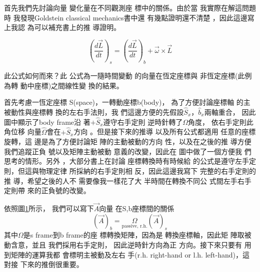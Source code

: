 \documentclass[12pt,a4paper]{article}
\begin{document}
首先我們先討論向量%
變化量在不同觀測座%
標中的關係。由於當%
我實際在解這問題時%
我發現Goldstein classical mechanics書中還%
有幾點證明還不清楚%
，因此這邊寫上我認%
為可以補充書上的推%
導證明。

\begin{equation}
\left( \frac{d\vec{L}}{dt}\right) _{s}=\left( \frac{d\vec{L}}{dt}\right)
_{b}+\vec{\omega}\times \vec{L}
\end{equation}

此公式如何而來？此%
公式為一隨時間變動%
的向量在恆定座標與%
非恆定座標(此例為轉%
動中座標)之間線性變%
換的結果。

\begin{figure}[th]
\caption{{}}
\label{firstfig}
\begin{center}
\end{center}
\end{figure}
\bigskip

首先考慮一恆定座標%
S(space)，一轉動座標b(body)，%
為了方便討論座標軸%
的主被動性與座標轉%
換的左右手法則，我%
們這邊方便的先假設$%
\hat{S}_{x}， \hat{b}_{x}$兩軸重合，%
因此圖中顯示了body frame沿%
著$+\hat{S}_{x}$遵守右手定則%
逆時針轉了$\Omega $角度，%
依右手定則此角位移%
向量$\hat{\Omega}$會在$+\hat{S}_{x}$方向%
。但是接下來的推導%
以及所有公式都適用%
任意的座標旋轉，這%
邊是為了方便討論矩%
陣的主動被動的方向%
性，以及在之後的推%
導方便我們追蹤正負%
號以及矩陣主動被動%
意義的改變，因此在%
圖中做了一個方便我%
們思考的情形。另外%
，大部分書上在討論%
座標轉換時有時候給%
的公式是遵守左手定%
則，但這與物理定律%
所採納的右手定則相%
反，因此這邊我寫下%
完整的右手定則的推%
導，希望之後的人不%
需要像我一樣花了大%
半時間在轉換不同公%
式間左手右手定則帶%
來的正負號的改變。

\bigskip 依照圖\ref{firstfig}所示，%
我們可以寫下$\vec{A}$向量%
在S,b座標間的關係%
\begin{equation*}
\left( \vec{A}\right) _{b}=\underset{\text{passive, r.h.}}{\Omega }\left( 
\vec{A}\right) _{s}
\end{equation*}%
其中$\Omega $是s frame到b frame的座%
標轉換矩陣，因為是%
轉換座標軸，因此矩%
陣取被動含意，並且%
我們採用右手定則，%
因此逆時針方向為正%
方向。接下來只要有%
用到矩陣的運算我都%
會標明主被動及左右%
手(r.h. right-hand or l.h. left-hand)，這對接%
下來的推倒很重要。
\end{document}
